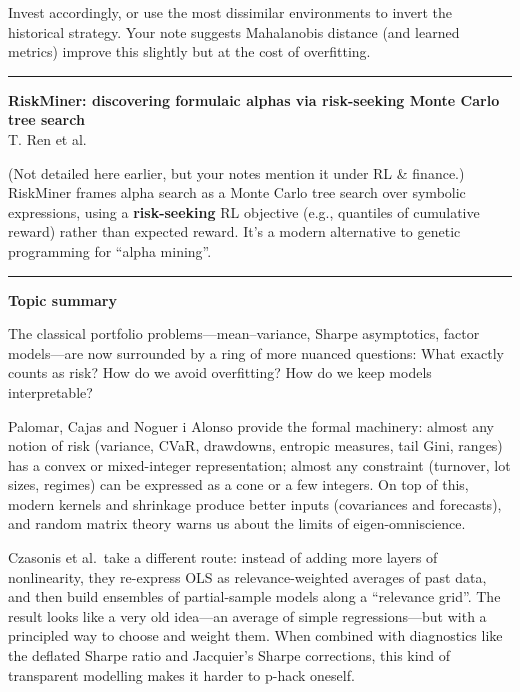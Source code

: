 \documentclass[a5paper]{article}
\def\subsection#1{{\par\bigskip\goodbreak\large\bfseries #1\par}}
\begin{document}
Invest accordingly, or use the most dissimilar environments to invert
the historical strategy. Your note suggests Mahalanobis distance (and
learned metrics) improve this slightly but at the cost of overfitting.

\begin{center}\rule{0.5\linewidth}{0.5pt}\end{center}

\textbf{RiskMiner: discovering formulaic alphas via risk-seeking Monte
Carlo tree search}\\
T. Ren et al.

(Not detailed here earlier, but your notes mention it under RL \&
finance.) RiskMiner frames alpha search as a Monte Carlo tree search
over symbolic expressions, using a \textbf{risk-seeking} RL objective
(e.g., quantiles of cumulative reward) rather than expected reward. It's
a modern alternative to genetic programming for ``alpha mining''.

\begin{center}\rule{0.5\linewidth}{0.5pt}\end{center}

\subsection{Topic summary}\label{topic-summary-7}

The classical portfolio problems---mean--variance, Sharpe asymptotics,
factor models---are now surrounded by a ring of more nuanced questions:
What exactly counts as risk? How do we avoid overfitting? How do we keep
models interpretable?

Palomar, Cajas and Noguer i Alonso provide the formal machinery: almost
any notion of risk (variance, CVaR, drawdowns, entropic measures, tail
Gini, ranges) has a convex or mixed-integer representation; almost any
constraint (turnover, lot sizes, regimes) can be expressed as a cone or
a few integers. On top of this, modern kernels and shrinkage produce
better inputs (covariances and forecasts), and random matrix theory
warns us about the limits of eigen-omniscience.

Czasonis et al.~take a different route: instead of adding more layers of
nonlinearity, they re-express OLS as relevance-weighted averages of past
data, and then build ensembles of partial-sample models along a
``relevance grid''. The result looks like a very old idea---an average
of simple regressions---but with a principled way to choose and weight
them. When combined with diagnostics like the deflated Sharpe ratio and
Jacquier's Sharpe corrections, this kind of transparent modelling makes
it harder to p-hack oneself.
\end{document}
